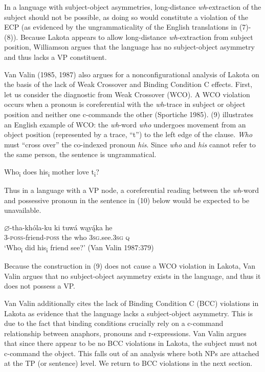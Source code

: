 \documentclass[output=paper]{LSP/langsci}
\begin{document}
In a language with subject-object asymmetries, long-distance \textit{wh}-extraction of the subject should not be possible, as doing so would constitute a violation of the ECP (as evidenced by the ungrammaticality of the English translations in (7)-(8)).  Because Lakota appears to allow long-distance \textit{wh}-extraction from subject position, Williamson argues that the language has no subject-object asymmetry and thus lacks a VP constituent.

Van Valin (1985, 1987) also argues for a nonconfigurational analysis of Lakota on the basis of the lack of Weak Crossover and Binding Condition C effects.  First, let us consider the diagnostic from Weak Crossover (WCO). A WCO violation occurs when a pronoun is coreferential with the \textit{wh}-trace in subject or object position and neither one c-commands the other (Sportiche 1985).  (9) illustrates an English example of WCO: the \textit{wh}-word \textit{who} undergoes movement from an object position (represented by a trace, ``t'') to the left edge of the clause. \textit{Who} must ``cross over'' the co-indexed pronoun \textit{his}. Since \textit{who} and \textit{his} cannot refer to the same person, the sentence is ungrammatical. 

\begin{exe}
\ex  *Who\textsubscript{i} does his\textsubscript{i} mother love t\textsubscript{i}?
\end{exe}

Thus in a language with a VP node, a coreferential reading between the \textit{wh}-word and possessive pronoun in the sentence in (10) below would be expected to be unavailable.

\begin{exe}
\ex \gll $\varnothing$-tha-kh\'ola-ku 	ki	tuw\'a	w\k{a}y\k{\'a}ka	he \\
3-\textsc{poss}-friend-\textsc{poss} the who		\textsc{3sg}.see.\textsc{3sg} 	\textsc{q} \\
\trans `Who\textsubscript{i} did his\textsubscript{i}  friend see?' (Van Valin 1987:379)
\end{exe}

Because the construction in (9) does not cause a WCO violation in Lakota, Van Valin argues that no subject-object asymmetry exists in the language, and thus it does not possess a VP.
	
Van Valin additionally cites the lack of Binding Condition C (BCC) violations in Lakota as evidence that the language lacks a subject-object asymmetry.  This is due to the fact that binding conditions crucially rely on a c-command relationship between anaphors, pronouns and r-expressions.  Van Valin argues that since there appear to be no BCC violations in Lakota, the subject must not c-command the object. This falls out of an analysis where both NPs are attached at the TP (or sentence) level. We return to BCC violations in the next section.
\end{document}
